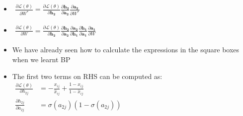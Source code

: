 \begin{frame}
\begin{columns}
        \begin{overlayarea}{\textwidth}{\textheight}
            \begin{itemize}
                \item<2-> $\displaystyle
                        \begin{aligned}
                            \frac{\partial \mathscr{L(\theta)}}{\partial W^*} = 
                            \frac{\partial \mathscr{L(\theta)}}{\partial \mathbf{h_2}}\frac{\partial \mathbf{h_2}}{\partial \mathbf{a_2}}\boxed{\frac{\partial \mathbf{a_2}}{\partial W^*}}
                        \end{aligned}$
                \item<3-> $\displaystyle
                        \begin{aligned}
                            \frac{\partial \mathscr{L(\theta)}}{\partial W} = 
                            \frac{\partial \mathscr{L(\theta)}}{\partial \mathbf{h_2}}\frac{\partial \mathbf{h_2}}{\partial \mathbf{a_2}}\boxed{\frac{\partial \mathbf{a_2}}{\partial \mathbf{h_1}}\frac{\partial \mathbf{h_1}}{\partial \mathbf{a_1}}\frac{\partial \mathbf{a_1}}{\partial W}}
                        \end{aligned}$
                \item<4-> We have already seen how to calculate the expressions in the square boxes when we learnt BP
                \item<5->The first two terms on RHS can be computed as:
                		$\displaystyle                        
                        \begin{aligned}
                            \frac{\partial \mathscr{L(\theta)}}{\partial h_{2j}} &= -\frac{x_{ij}}{\hat{x}_{ij}} + \frac{1 - x_{ij}}{1 - \hat{x}_{ij}}\\
                            \frac{\partial h_{2j}}{\partial a_{2j}} &= \sigma(a_{2j}) (1 - \sigma(a_{2j})) %
                        \end{aligned}$
            \end{itemize}
        \end{overlayarea}
    \end{columns}
\end{frame}